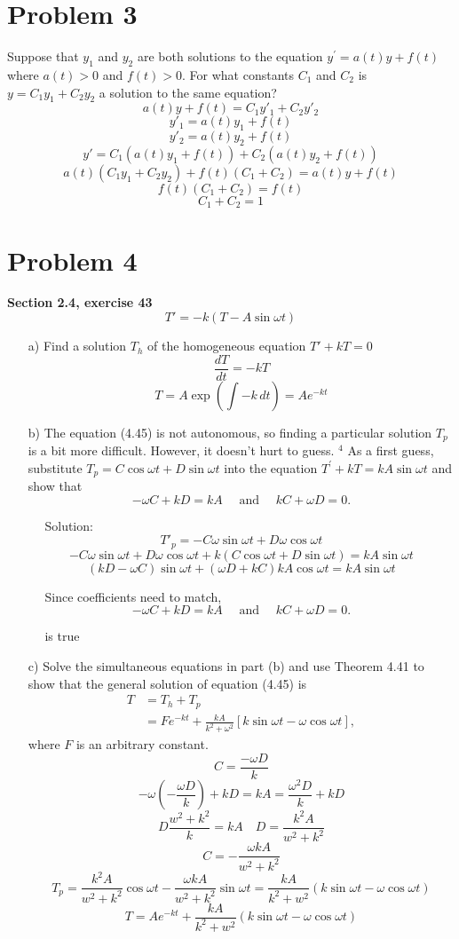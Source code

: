 \documentclass[hidelinks]{article}
\begin{document}
\section*{Problem 3}
Suppose that $y_1$ and $y_2$ are both solutions to the equation $y^{\prime}=a(t) y+f(t)$ where $a(t)>0$ and $f(t)>0$. For what constants $C_1$ and $C_2$ is $y=C_1 y_1+C_2 y_2$ a solution to the same equation?
\[
    a(t)y + f(t) = C_1y'_1 + C_2y'_2
\]
\[
    y'_1 = a(t)y_1 + f(t) 
\]
\[
    y'_2 = a(t)y_2 + f(t) 
\]
\[
    y' = C_1(a(t)y_1 + f(t)) + C_2(a(t)y_2 + f(t))
\]
\[
    a(t)(C_1y_1 + C_2y_2) + f(t)(C_1 + C_2) = a(t)y + f(t)
\]
\[
    f(t)(C_1 + C_2) = f(t)
\]
\[
    C_1 + C_2 = 1
\]
\newpage
\section*{Problem 4}
\textbf{Section 2.4, exercise 43}
\[
    T' = -k(T - A \sin \omega t)
\]
\begin{itemize}
    \item[a)] Find a solution $T_h$ of the homogeneous equation $T' + kT = 0$
    \[
        \frac{dT}{dt} = -kT  
    \]
    \[
        T = A\exp(\int -k \, dt) = Ae^{-kt}
    \]
    \item[b)] The equation (4.45) is not autonomous, so finding a particular solution $T_p$ is a bit more difficult. However, it doesn't hurt to guess. ${ }^4$ As a first guess, substitute $T_p=C \cos \omega t+D \sin \omega t$ into the equation $T^{\prime}+k T=k A \sin \omega t$ and show that
$$
-\omega C+k D=k A \quad \text { and } \quad k C+\omega D=0 .
$$
    \item[ ] $\quad$ Solution:
\[
    T'_p = -C\omega \sin\omega t + D \omega \cos \omega t 
\]
\[
-C\omega \sin\omega t + D \omega \cos \omega t + k(C \cos \omega t + D \sin \omega t) = kA \sin \omega t
\]
\[
    (kD - \omega C)\sin \omega t + (\omega D + kC) kA \cos \omega t
= kA \sin \omega t
\]
    \item[ ] $\quad$ Since coefficients need to match, 
$$
-\omega C+k D=k A \quad \text { and } \quad k C+\omega D=0 .
$$
    \item[ ] $\quad$ is true 
    \item[c)] Solve the simultaneous equations in part (b) and use Theorem 4.41 to show that the general solution of equation (4.45) is
$$
\begin{aligned}
T & =T_h+T_p \\
& =F e^{-k t}+\frac{k A}{k^2+\omega^2}[k \sin \omega t-\omega \cos \omega t],
\end{aligned}
$$
where $F$ is an arbitrary constant.
\[
    C = \frac{-\omega D}{k}
\]
\[
    -\omega (-\frac{\omega D}{k})+k D=kA = \frac{\omega^2 D}{k} + kD  
\]
\[
    D\frac{w^2 + k^2}{k} = kA \quad D = \frac{k^2 A}{w^2+k^2} 
\]
\[
    C = -\frac{\omega k A}{w^2 + k^2}
\]
\[
T_p =\frac{k^2 A}{w^2+k^2} \cos \omega t  -\frac{\omega k A}{w^2 + k^2} \sin \omega t
= \frac{kA}{k^2 + w^2}(k \sin \omega t - \omega \cos \omega t)
\]
\[
    T = Ae^{-kt} + 
 \frac{kA}{k^2 + w^2}(k \sin \omega t - \omega \cos \omega t)
\]
\end{itemize}
\newpage
\end{document}
